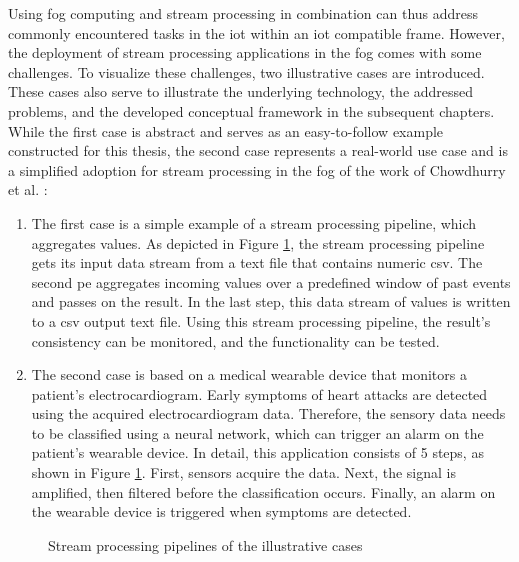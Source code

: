 Using fog computing and stream processing in combination can thus address commonly encountered tasks in the \gls{iot} within an \gls{iot} compatible frame. However, the deployment of stream processing applications in the fog comes with some challenges. To visualize these challenges, two illustrative cases are introduced. These cases also serve to illustrate the underlying technology, the addressed problems, and the developed conceptual framework in the subsequent chapters. While the first case is abstract and serves as an easy-to-follow example constructed for this thesis, the second case represents a real-world use case and is a simplified adoption for stream processing in the fog of the work of Chowdhurry et al. \cite{Chowdhury.2019}:\par

\begin{enumerate}[label=Case \arabic* , wide=0.5em,  leftmargin=*]
    \item \label{cAggregation} The first case is a simple example of a stream processing pipeline, which aggregates values. As depicted in Figure \ref{fExemplaryCases}, the stream processing pipeline gets its input data stream from a text file that contains numeric \gls{csv}. The second \gls{pe} aggregates incoming values over a predefined window of past events and passes on the result. In the last step, this data stream of values is written to a \gls{csv} output text file. Using this stream processing pipeline, the result's consistency can be monitored, and the functionality can be tested.
    \item \label{cMedical} The second case is based on a medical wearable device that monitors a patient’s electrocardiogram. Early symptoms of heart attacks are detected using the acquired electrocardiogram data. Therefore, the sensory data needs to be classified using a neural network, which can trigger an alarm on the patient’s wearable device. In detail, this application consists of 5 steps, as shown in Figure \ref{fExemplaryCases}. First, sensors acquire the data. Next, the signal is amplified, then filtered before the classification occurs. Finally, an alarm on the wearable device is triggered when symptoms are detected.
\end{enumerate}

\begin{figure}[H]
\graphicspath{{./figures/code/}}

\caption{Stream processing pipelines of the illustrative cases}
\label{fExemplaryCases}
\end{figure}


